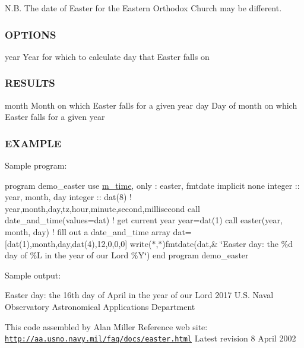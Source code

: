 N.\+B. The date of Easter for the Eastern Orthodox Church may be different.

\subsubsection*{O\+P\+T\+I\+O\+NS}

year Year for which to calculate day that Easter falls on \subsubsection*{R\+E\+S\+U\+L\+TS}

month Month on which Easter falls for a given year day Day of month on which Easter falls for a given year

\subsubsection*{E\+X\+A\+M\+P\+LE}

Sample program\+:

program demo\+\_\+easter use \hyperlink{namespacem__time}{m\+\_\+time}, only \+: easter, fmtdate implicit none integer \+:\+: year, month, day integer \+:\+: dat(8) ! year,month,day,tz,hour,minute,second,millisecond call date\+\_\+and\+\_\+time(values=dat) ! get current year year=dat(1) call easter(year, month, day) ! fill out a date\+\_\+and\+\_\+time array dat=\mbox{[}dat(1),month,day,dat(4),12,0,0,0\mbox{]} write($\ast$,$\ast$)fmtdate(dat,\& \char`\"{}\+Easter day\+: the \%d day of \%\+L in the year of our Lord \%\+Y\char`\"{}) end program demo\+\_\+easter

Sample output\+:

Easter day\+: the 16th day of April in the year of our Lord 2017 U.\+S. Naval Observatory Astronomical Applications Department

This code assembled by Alan Miller Reference web site\+: \href{http://aa.usno.navy.mil/faq/docs/easter.html}{\tt http\+://aa.\+usno.\+navy.\+mil/faq/docs/easter.\+html} Latest revision 8 April 2002 \mbox{\label{namespacem__time_a915b29d3b8abeeb7455eb5d6eed28790}} 
